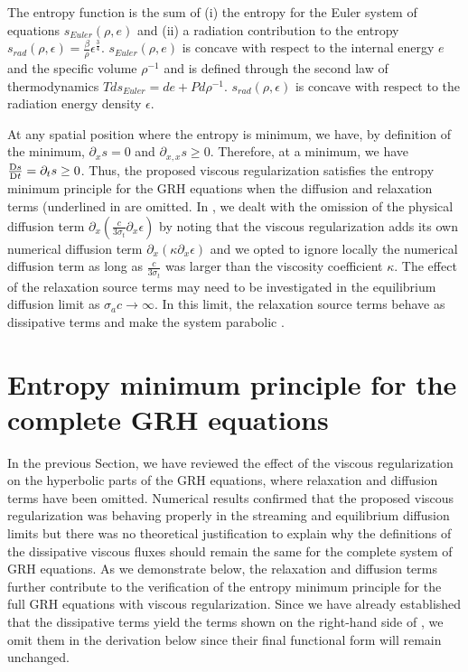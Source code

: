 \documentclass{mc2015}
\begin{document}
%
The entropy function is the sum of (i) the entropy for the Euler system of equations $s_{Euler}(\rho, e)$ and (ii) a radiation contribution to the entropy $s_{rad}(\rho,\epsilon)=\tfrac{\beta}{\rho} \epsilon^\frac{3}{4}$. 
$s_{Euler}(\rho, e)$ is concave with respect to the internal energy $e$ and the specific volume $\rho^{-1}$ and is defined through the second law of thermodynamics $Tds_{Euler} = de + P d \rho^{-1}$. $s_{rad}(\rho,\epsilon)$ is concave with respect to the radiation energy density $\epsilon$. 
%

At any spatial position where the entropy is minimum, we have, by definition of the minimum, $\partial_x s =0$ and $\partial_{x,x} s \geq 0$. Therefore, at a minimum, we have $\frac{\textrm{D} s}{\textrm{D} t}=\partial_t s \geq 0$. Thus, the proposed viscous regularization satisfies the entropy minimum principle for the GRH equations when the diffusion and relaxation terms (underlined in  are omitted. In \cite{our_jcp_radhy_paper}, we dealt with the omission of the physical diffusion term $\partial_x( \tfrac{c}{3 \sigma_t} \partial_x \epsilon)$ by noting that the viscous regularization adds its own numerical diffusion term $\partial_x \left( \kappa \partial_x \epsilon \right)$ and we opted to ignore
locally the numerical diffusion term as long as $\frac{c}{3 \sigma_t}$ was larger than the viscosity coefficient $\kappa$. 
%
The effect of the relaxation source terms may need to be investigated in the equilibrium diffusion limit as $\sigma_a c \to \infty$. In this limit, the relaxation source terms behave as dissipative terms and make the system parabolic \cite{Leveque}. 



\section{Entropy minimum principle for the complete GRH equations}\label{sec:VR_new}

In the previous Section, we have reviewed the effect of the viscous regularization on the hyperbolic parts of the GRH equations, where relaxation and diffusion terms have been omitted. Numerical results confirmed that the proposed viscous regularization was behaving properly in the streaming and equilibrium diffusion limits but there was no theoretical justification to explain why the definitions of the dissipative viscous fluxes should remain the same for the complete system of GRH equations. As we demonstrate below, the relaxation and diffusion terms further contribute to the verification of the entropy minimum principle for the full GRH equations with viscous regularization. Since we have already established that the dissipative terms yield the terms shown on the right-hand side of , we omit them in the derivation below since their final functional form will remain unchanged.
\end{document}
